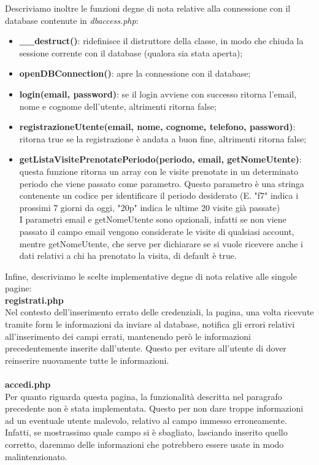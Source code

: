 Descriviamo inoltre le funzioni degne di nota relative alla connessione con il database contenute in \textit{dbaccess.php}:
\begin{itemize}
\item \textbf{\_\_destruct()}: ridefinisce il distruttore della classe, in modo che chiuda la sessione corrente con il database (qualora sia stata aperta);
\item \textbf{openDBConnection()}: apre la connessione con il database;
\item \textbf{login(email, password)}: se il login avviene con successo ritorna l'email, nome e cognome dell'utente, altrimenti ritorna false;
\item \textbf{registrazioneUtente(email, nome, cognome, telefono, password)}: ritorna true se la registrazione è andata a buon fine, altrimenti ritorna false;
\item \textbf{getListaVisitePrenotatePeriodo(periodo, email, getNomeUtente)}: questa funzione ritorna un array con le visite prenotate in un determinato periodo che viene passato come parametro. Questo parametro è una stringa contenente un codice per identificare il periodo desiderato (E. "f7" indica i prossimi 7 giorni da oggi, "20p" indica le ultime 20 visite già passate) \\I parametri email e getNomeUtente sono opzionali, infatti se non viene passato il campo email vengono considerate le visite di qualsiasi account, mentre getNomeUtente, che serve per dichiarare se si vuole ricevere anche i dati relativi a chi ha prenotato la visita, di default è true.
\end{itemize}

\pagebreak

Infine, descriviamo le scelte implementative degne di nota relative alle singole pagine: \\

\textbf{registrati.php} \\ 
Nel contesto dell'inserimento errato delle credenziali, la pagina, una volta ricevute tramite form le informazioni da inviare al database, notifica gli errori relativi all'inserimento dei campi errati, mantenendo però le informazioni precedentemente inserite dall'utente. Questo per evitare all'utente di dover reinserire nuovamente tutte le informazioni. \\ \\

\textbf{accedi.php} \\ 
Per quanto riguarda questa pagina, la funzionalità descritta nel paragrafo precedente non è stata implementata. Questo per non dare troppe informazioni ad un eventuale utente malevolo, relativo al campo immesso erroneamente. Infatti, se mostrassimo quale campo si è sbagliato, lasciando inserito quello corretto, daremmo delle informazioni che potrebbero essere usate in modo malintenzionato. \\ \\

